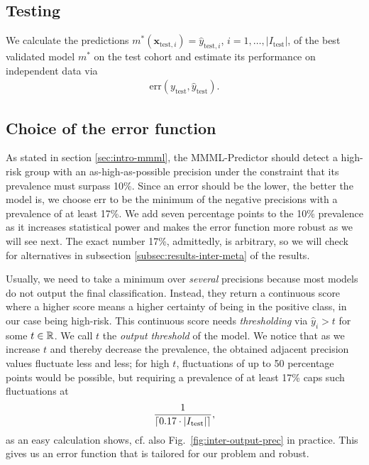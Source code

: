 \subsection{Testing}

We calculate the predictions $m^*(\mathbf{x}_{\text{test}, i}) = \hat{y}_{\text{test}, i}$, $i = 
1, \ldots, |I_\text{test}|$, of the 
best validated model $m^*$ on the test cohort and estimate its performance on independent data via 
\begin{align}
    \text{err}(y_\text{test}, \hat{y}_\text{test}).
\end{align}

\subsection{Choice of the error function}\label{subsec:error-function}

As stated in section \ref{sec:intro-mmml}, the MMML-Predictor should detect a high-risk group 
with an as-high-as-possible precision under the constraint that its prevalence must surpass 
\num{10}\%. Since an error should be the lower, the better the model is, we choose 
$\text{err}$ to be the minimum of the negative precisions with a prevalence of at least \num{17}\%. We 
add seven percentage points to the \num{10}\% prevalence as it increases statistical power and makes 
the error function more robust as we will see next. The exact number \num{17}\%, admittedly, is 
arbitrary, so we will check for alternatives in subsection \ref{subsec:results-inter-meta} of the 
results.

Usually, we need 
to take a minimum over \textit{several} precisions because most models do not output the final 
classification.
Instead, they return a continuous score where a higher score means a higher certainty of being
in the positive class, in our case being high-risk. This continuous score needs 
\textit{thresholding} via $\hat{y}_i > t$ for some $t \in \RR$. We call $t$ the \textit{output
threshold} of the model. 
We notice that as we increase $t$ and thereby decrease the prevalence, the obtained 
adjacent precision values fluctuate less and less; for high $t$, fluctuations of up to \num{50} 
percentage points would be possible, but requiring a prevalence of at least 17\% caps such 
fluctuations at 
\begin{align}
    \frac{1}{\ceil*{\num{0.17} \cdot |I_\text{test}|}},
\end{align}
as an easy calculation shows, cf. also Fig.\ 
\ref{fig:inter-output-prec} in practice. This gives us an error function that is tailored 
for our problem and robust.

